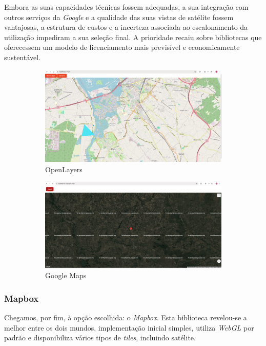 Embora as suas capacidades técnicas fossem adequadas, a sua integração com outros serviços da \textit{Google} e a qualidade das suas vistas de satélite fossem vantajosas, a estrutura de custos e a incerteza associada ao escalonamento da utilização impediram a sua seleção final. A prioridade recaiu sobre bibliotecas que oferecessem um modelo de licenciamento mais previsível e economicamente sustentável.

\begin{figure}[!h]
	\centering
	\begin{subfigure}[c]{0.45\textwidth}
	\centering
	\includegraphics[width=\textwidth]{figs/ol.png}
	\caption[Open Layers]{OpenLayers}
	\label{fig:ol}
	\end{subfigure}
	\hfill
	\begin{subfigure}[c]{0.45\textwidth}
		\centering
		\includegraphics[width=\textwidth]{figs/gm.png}
		\caption[Google maps]{Google Maps}
		\label{fig:gm}
	\end{subfigure}
	\caption{}
    \label{fig:1}
\end{figure}

\clearpage
\subsubsection{\textbf{Mapbox}}\label{sec:mapbox} %
Chegamos, por fim, à opção escolhida: o \textit{Mapbox}. Esta biblioteca revelou-se a melhor entre os dois mundos, implementação inicial simples, utiliza \textit{WebGL} por padrão e disponibiliza vários tipos de \textit{tiles}, incluindo satélite. 

